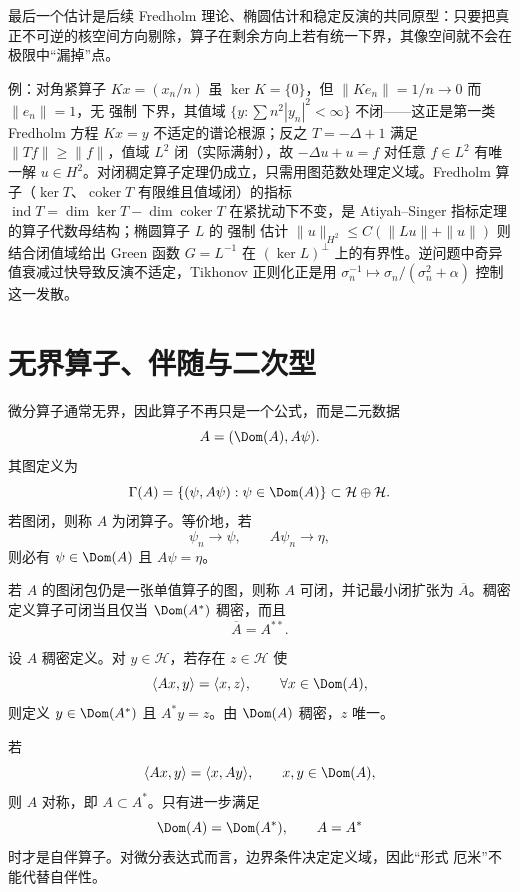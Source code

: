 最后一个估计是后续 Fredholm 理论、椭圆估计和稳定反演的共同原型：只要把真正不可逆的核空间方向剔除，算子在剩余方向上若有统一下界，其像空间就不会在极限中``漏掉''点。

例：对角紧算子 $Kx=(x_n/n)$ 虽 $\ker K=\{0\}$，但 $\|Ke_n\|=1/n\to0$ 而 $\|e_n\|=1$，无 强制 下界，其值域 $\{y:\sum n^2|y_n|^2<\infty\}$ 不闭——这正是第一类 Fredholm 方程 $Kx=y$ 不适定的谱论根源；反之 $T=-\Delta+1$ 满足 $\|Tf\|\ge\|f\|$，值域 $L^2$ 闭（实际满射），故 $-\Delta u+u=f$ 对任意 $f\in L^2$ 有唯一解 $u\in H^2$。对闭稠定算子定理仍成立，只需用图范数处理定义域。Fredholm 算子（$\ker T$、$\operatorname{coker}T$ 有限维且值域闭）的指标 $\operatorname{ind}T=\dim\ker T-\dim\operatorname{coker}T$ 在紧扰动下不变，是 Atiyah--Singer 指标定理的算子代数母结构；椭圆算子 $L$ 的 强制 估计 $\|u\|_{H^2}\le C(\|Lu\|+\|u\|)$ 则结合闭值域给出 Green 函数 $G=L^{-1}$ 在 $(\ker L)^\perp$ 上的有界性。逆问题中奇异值衰减过快导致反演不适定，Tikhonov 正则化正是用 $\sigma_n^{-1}\mapsto\sigma_n/(\sigma_n^2+\alpha)$ 控制这一发散。

\section{无界算子、伴随与二次型}
\begin{definition}[算子的图与闭性]
微分算子通常无界，因此算子不再只是一个公式，而是二元数据
\[
{A=(\Dom(A),A\psi)}.
\]
其图定义为
\[
\Gamma(A)=\{(\psi,A\psi):\psi\in\Dom(A)\}\subset\mathcal H\oplus\mathcal H.
\]
若图闭，则称 $A$ 为闭算子。等价地，若
\[
\psi_n\to\psi,
\qquad
A\psi_n\to\eta,
\]
则必有 $\psi\in\Dom(A)$ 且 $A\psi=\eta$。
\end{definition}

\begin{proposition}[可闭性与双伴随]
若 $A$ 的图闭包仍是一张单值算子的图，则称 $A$ 可闭，并记最小闭扩张为 $\overline A$。稠密定义算子可闭当且仅当 $\Dom(A^*)$ 稠密，而且
\[
{\overline A=A^{**}}.
\]
\end{proposition}

\begin{definition}[稠密定义算子的伴随]
设 $A$ 稠密定义。对 $y\in\mathcal H$，若存在 $z\in\mathcal H$ 使
\[
\langle Ax,y\rangle=\langle x,z\rangle,
\qquad \forall x\in\Dom(A),
\]
则定义 $y\in\Dom(A^*)$ 且 $A^*y=z$。由 $\Dom(A)$ 稠密，$z$ 唯一。
\end{definition}

\begin{definition}[对称算子与自伴算子]
若
\[
\langle Ax,y\rangle=\langle x,Ay\rangle,
\qquad x,y\in\Dom(A),
\]
则 $A$ 对称，即 $A\subset A^*$。只有进一步满足
\[
{\Dom(A)=\Dom(A^*),\qquad A=A^*}
\]
时才是自伴算子。对微分表达式而言，边界条件决定定义域，因此“形式 厄米”不能代替自伴性。
\end{definition}


